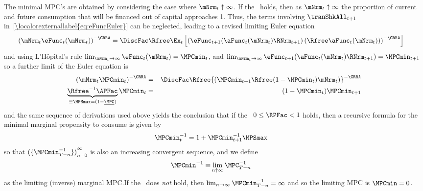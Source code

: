 \documentclass[\econtexRoot/BufferStockTheory]{subfiles}
\begin{document}
The minimal MPC's are obtained by considering the case where $\mNrm_{t} \uparrow \infty$.  If the \FHWC~holds, then as $\mNrm_{t} \uparrow \infty$ the proportion of current and future consumption that will be financed out of capital approaches 1.  Thus, the terms involving $\tranShkAll_{t+1}$ in~\eqref{\localorexternallabel{eq:eFuncEuler}} can be neglected, leading to a revised limiting Euler equation
\begin{eqnarray*}
 {({\mNrm_{t}}\eFunc_{t}(\mNrm_{t}))}^{-\CRRA}  & = \DiscFac \Rfree \Ex_{t}\left[{\left(\eFunc_{t+1}(\aFunc_{t}(\mNrm_{t})\RNrm_{t+1})\left({\Rfree \aFunc_{t}(\mNrm_{t})}\right)\right)}^{-\CRRA}\right]
\end{eqnarray*}
and using L'H\^opital's rule $\lim_{\mNrm_{t} \rightarrow \infty} \eFunc_{t}(\mNrm_{t}) = \MPCmin_{t}$, and $\lim_{\mNrm_{t} \rightarrow \infty} \eFunc_{t+1}(\aFunc_{t}(\mNrm_{t})\RNrm_{t+1}) = \MPCmin_{t+1}$ so a further limit of the Euler equation is\hypertarget{MPCnvrs}{}
\begin{eqnarray*}
  {(\mNrm_{t}\MPCmin_{t})}^{-\CRRA}  & = & \DiscFac \Rfree {\left(\MPCmin_{t+1} \Rfree (1-\MPCmin_{t})\mNrm_{t}\right)}^{-\CRRA}
\\ \underbrace{{\Rfree}^{-1}{\APFac}}_{\equiv \MPSmax = (1-\underline{\MPC})} \MPCmin_{t}  & = & (1-\MPCmin_{t}) \MPCmin_{t+1}
\end{eqnarray*}
and the same sequence of derivations used above yields the conclusion
that if the \RIC~$0 \leq \RPFac < 1$ holds, then a recursive formula for the
minimal marginal propensity to consume is given by
\begin{equation}\begin{gathered}\begin{aligned}
 \MPCmin_{t}^{-1}  & = 1+\MPCmin_{t+1}^{-1}\MPSmax  \label{eq:MPCminInvApndx}
\end{aligned}\end{gathered}\end{equation}
so that ${(\{\MPCmin_{T-n}^{-1}\})}_{n=0}^{\infty}$ is also an increasing
convergent sequence, and we define
\begin{equation}\begin{gathered}\begin{aligned}
\MPCmin^{-1} \equiv &\lim_{n \uparrow \infty} \MPC_{T-n}^{-1}  
\end{aligned}\end{gathered}\end{equation}
as the limiting (inverse) marginal MPC.\@  If the \RIC~does \textit{not} hold, then $\lim_{n \rightarrow \infty} \MPCmin_{T-n}^{-1} = \infty$
and so the limiting MPC is $\MPCmin = 0$.
\end{document}
